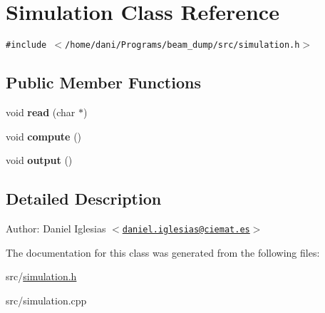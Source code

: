 \hypertarget{classSimulation}{
\section{Simulation Class Reference}
\label{classSimulation}
}
{\tt \#include $<$/home/dani/Programs/beam\_\-dump/src/simulation.h$>$}

\subsection*{Public Member Functions}
\begin{CompactItemize}
\item 
\hypertarget{classSimulation_7da40348e01c14777853a5f9e3f4d0e9}{
void \textbf{read} (char $\ast$)}
\label{classSimulation_7da40348e01c14777853a5f9e3f4d0e9}

\item 
\hypertarget{classSimulation_dd5f5f74f34dc0a7e1fe2578f071fb07}{
void \textbf{compute} ()}
\label{classSimulation_dd5f5f74f34dc0a7e1fe2578f071fb07}

\item 
\hypertarget{classSimulation_d1f0c2b7ad3b17c6bd4899624716ed88}{
void \textbf{output} ()}
\label{classSimulation_d1f0c2b7ad3b17c6bd4899624716ed88}

\end{CompactItemize}


\subsection{Detailed Description}
\begin{Desc}
\item[Author:]Daniel Iglesias $<$\href{mailto:daniel.iglesias@ciemat.es}{\tt daniel.iglesias@ciemat.es}$>$ \end{Desc}


The documentation for this class was generated from the following files:\begin{CompactItemize}
\item 
src/\hyperlink{simulation_8h}{simulation.h}\item 
src/simulation.cpp\end{CompactItemize}
